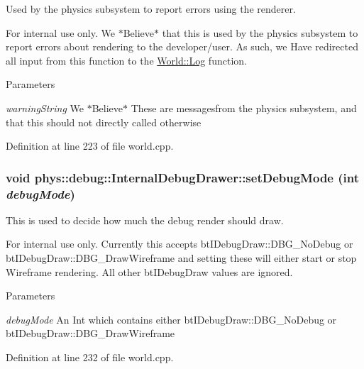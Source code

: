 Used by the physics subsystem to report errors using the renderer. 

\begin{DoxyInternal}{For internal use only.}
We $\ast$Believe$\ast$ that this is used by the physics subsystem to report errors about rendering to the developer/user. As such, we Have redirected all input from this function to the \hyperlink{classphys_1_1World_a05267a20e8d5518771d0848190b33d60}{World::Log} function. 
\begin{DoxyParams}{Parameters}
\item[{\em warningString}]We $\ast$Believe$\ast$ These are messagesfrom the physics subsystem, and that this should not directly called otherwise \end{DoxyParams}
\end{DoxyInternal}


Definition at line 223 of file world.cpp.

\hypertarget{classphys_1_1debug_1_1InternalDebugDrawer_a63059b273ed6031a393b2d994b820bcc}{
\subsubsection[{setDebugMode}]{\setlength{\rightskip}{0pt plus 5cm}void phys::debug::InternalDebugDrawer::setDebugMode (int {\em debugMode})}}
\label{db/d27/classphys_1_1debug_1_1InternalDebugDrawer_a63059b273ed6031a393b2d994b820bcc}


This is used to decide how much the debug render should draw. 

\begin{DoxyInternal}{For internal use only.}
Currently this accepts btIDebugDraw::DBG\_\-NoDebug or btIDebugDraw::DBG\_\-DrawWireframe and setting these will either start or stop Wireframe rendering. All other btIDebugDraw values are ignored. 
\begin{DoxyParams}{Parameters}
\item[{\em debugMode}]An Int which contains either btIDebugDraw::DBG\_\-NoDebug or btIDebugDraw::DBG\_\-DrawWireframe \end{DoxyParams}
\end{DoxyInternal}


Definition at line 232 of file world.cpp.

